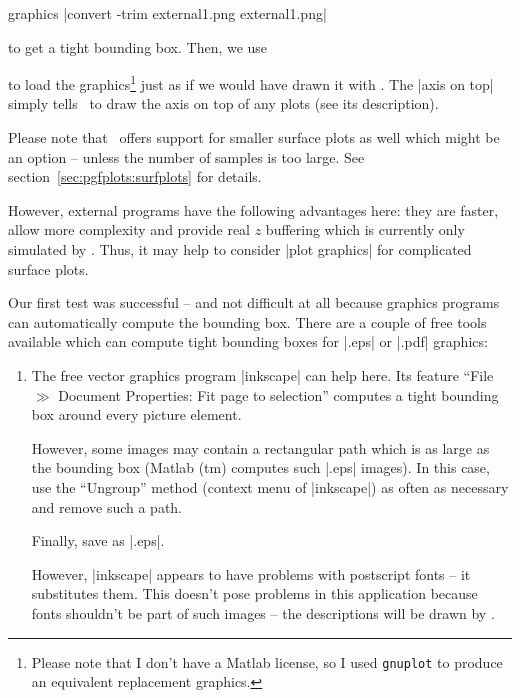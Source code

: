 {\begin{addplotoperation}[]{graphics}{}
	|convert -trim external1.png external1.png|

	to get a tight bounding box. Then, we use

\begin{codeexample}[]
\end{codeexample}
\noindent to load the graphics\footnote{Please note that I don't have a Matlab license, so I used \texttt{gnuplot} to produce an equivalent replacement graphics.} just as if we would have drawn it with \PGFPlots. The |axis on top| simply tells \PGFPlots\ to draw the axis on top of any plots (see its description).

Please note that \PGFPlots\ offers support for smaller surface plots as well which might be an option -- unless the number of samples is too large. See section~\ref{sec:pgfplots:surfplots} for details.

\noindent However, external programs have the following advantages here: they are faster, allow more complexity and provide real $z$ buffering which is currently only simulated by \PGFPlots. Thus, it may help to consider |plot graphics| for complicated surface plots.

Our first test was successful -- and not difficult at all because graphics programs can automatically compute the bounding box. There are a couple of free tools available which can compute tight bounding boxes for |.eps| or |.pdf| graphics:
\begin{enumerate}
	\item The free vector graphics program |inkscape| can help here. Its feature ``File $\gg$ Document Properties: Fit page to selection'' computes a tight bounding box around every picture element. 

	However, some images may contain a rectangular path which is as large as the bounding box (Matlab (tm) computes such |.eps| images). In this case, use the ``Ungroup'' method (context menu of |inkscape|) as often as necessary and remove such a path.

	Finally, save as |.eps|.

	However, |inkscape| appears to have problems with postscript fonts -- it substitutes them. This doesn't pose problems in this application because fonts shouldn't be part of such images -- the descriptions will be drawn by \PGFPlots.


\end{enumerate}
\end{addplotoperation}}
